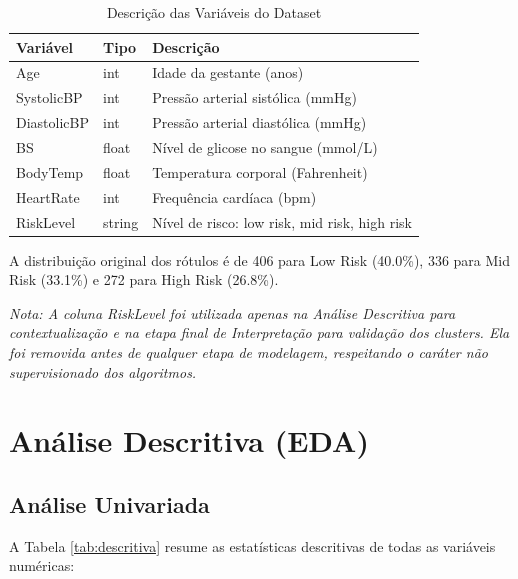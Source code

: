 \documentclass[12pt]{article}
\begin{document}
\begin{table}[H]
\centering
\caption{Descrição das Variáveis do Dataset}
\label{tab:dataset_desc}
\begin{tabular}{lll}
\toprule
\textbf{Variável} & \textbf{Tipo} & \textbf{Descrição} \\
\midrule
Age & int & Idade da gestante (anos) \\
SystolicBP & int & Pressão arterial sistólica (mmHg) \\
DiastolicBP & int & Pressão arterial diastólica (mmHg) \\
BS & float & Nível de glicose no sangue (mmol/L) \\
BodyTemp & float & Temperatura corporal (Fahrenheit) \\
HeartRate & int & Frequência cardíaca (bpm) \\
RiskLevel & string & Nível de risco: low risk, mid risk, high risk \\
\bottomrule
\end{tabular}
\end{table}

A distribuição original dos rótulos é de 406 para Low Risk (40.0\%), 336 para Mid Risk (33.1\%) e 272 para High Risk (26.8\%). 

\textit{Nota: A coluna RiskLevel foi utilizada apenas na Análise Descritiva para contextualização e na etapa final de Interpretação para validação dos clusters. Ela foi removida antes de qualquer etapa de modelagem, respeitando o caráter não supervisionado dos algoritmos.}

\section{Análise Descritiva (EDA)}

\subsection{Análise Univariada}

A Tabela \ref{tab:descritiva} resume as estatísticas descritivas de todas as variáveis numéricas:
\end{document}
